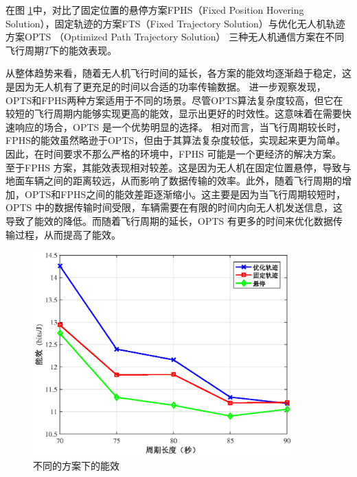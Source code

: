 

在图 \ref{不同的方案下的能效}中，对比了固定位置的悬停方案FPHS（Fixed Position Hovering Solution），固定轨迹的方案FTS（Fixed Trajectory Solution）与优化无人机轨迹方案OPTS （Optimized Path Trajectory Solution）
三种无人机通信方案在不同飞行周期$T$下的能效表现。

从整体趋势来看，随着无人机飞行时间的延长，各方案的能效均逐渐趋于稳定，这是因为无人机有了更充足的时间以合适的功率传输数据。
进一步观察发现，OPTS和FPHS两种方案适用于不同的场景。尽管OPTS算法复杂度较高，但它在较短的飞行周期内能够实现更高的能效，显示出更好的时效性。这意味着在需要快速响应的场合，OPTS 是一个优势明显的选择。
相对而言，当飞行周期较长时，FPHS的能效虽然略逊于OPTS，但由于其算法复杂度较低，实现起来更为简单。因此，在时间要求不那么严格的环境中，FPHS 可能是一个更经济的解决方案。
至于FPHS 方案，其能效表现相对较差。这是因为无人机在固定位置悬停，导致与地面车辆之间的距离较远，从而影响了数据传输的效率。此外，随着飞行周期的增加，OPTS和FPHS之间的能效差距逐渐缩小。这主要是因为当飞行周期较短时，OPTS 中的数据传输时间受限，车辆需要在有限的时间内向无人机发送信息，这导致了能效的降低。而随着飞行周期的延长，OPTS 有更多的时间来优化数据传输过程，从而提高了能效。

\begin{figure}[H]
\centering
\includegraphics[width=10cm]{figures//chap4//不同的方案下的能效.eps}
\caption{不同的方案下的能效}
\label{不同的方案下的能效}
\end{figure}

